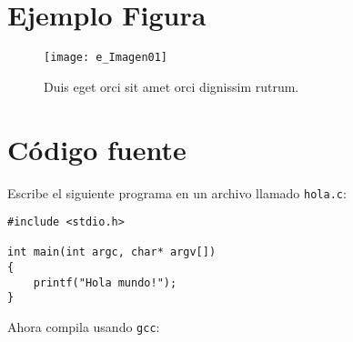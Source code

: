 \documentclass[12pt]{article}
\begin{document}
\lipsum[2]

\section{Ejemplo Figura}
\lipsum[3-4]

\begin{figure}[!tbp]
\centering
\texttt{[image: e\_Imagen01]}
\caption{Duis eget orci sit amet orci dignissim rutrum.}
\label{fig:particion}
\end{figure}


\section{Código fuente}
\lipsum[1-2]
\noindent
Escribe el siguiente programa en un archivo llamado \texttt{hola.c}:

\begin{lstlisting}[style=C]
#include <stdio.h>

int main(int argc, char* argv[]) 
{
    printf("Hola mundo!");
}
\end{lstlisting}

\noindent
Ahora compila usando \texttt{gcc}:




\nocite{*}
\end{document}
